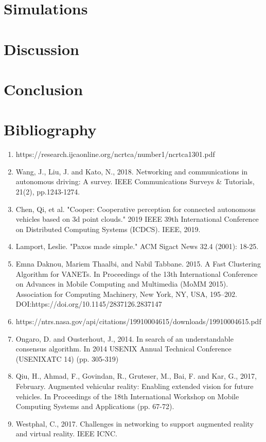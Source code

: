 \documentclass{article}
\begin{document}
\section{Simulations}
\section{Discussion}
\section{Conclusion}
\section{Bibliography}
\begin{enumerate}
    \item https://research.ijcaonline.org/ncrtca/number1/ncrtca1301.pdf
    \item Wang, J., Liu, J. and Kato, N., 2018. Networking and communications in autonomous driving: A survey. IEEE Communications Surveys & Tutorials, 21(2), pp.1243-1274.
    \item Chen, Qi, et al. "Cooper: Cooperative perception for connected autonomous vehicles based on 3d point clouds." 2019 IEEE 39th International Conference on Distributed Computing Systems (ICDCS). IEEE, 2019.
    \item Lamport, Leslie. "Paxos made simple." ACM Sigact News 32.4 (2001): 18-25.
    \item Emna Daknou, Mariem Thaalbi, and Nabil Tabbane. 2015. A Fast Clustering Algorithm for VANETs. In Proceedings of the 13th International Conference on Advances in Mobile Computing and Multimedia (MoMM 2015). Association for Computing Machinery, New York, NY, USA, 195–202. DOI:https://doi.org/10.1145/2837126.2837147
    \item https://ntrs.nasa.gov/api/citations/19910004615/downloads/19910004615.pdf
    \item Ongaro, D. and Ousterhout, J., 2014. In search of an understandable consensus algorithm. In 2014 {USENIX} Annual Technical Conference ({USENIX}{ATC} 14) (pp. 305-319)
    \item Qiu, H., Ahmad, F., Govindan, R., Gruteser, M., Bai, F. and Kar, G., 2017, February. Augmented vehicular reality: Enabling extended vision for future vehicles. In Proceedings of the 18th International Workshop on Mobile Computing Systems and Applications (pp. 67-72).
    \item Westphal, C., 2017. Challenges in networking to support augmented reality and virtual reality. IEEE ICNC.

\end{enumerate}
\end{document}
